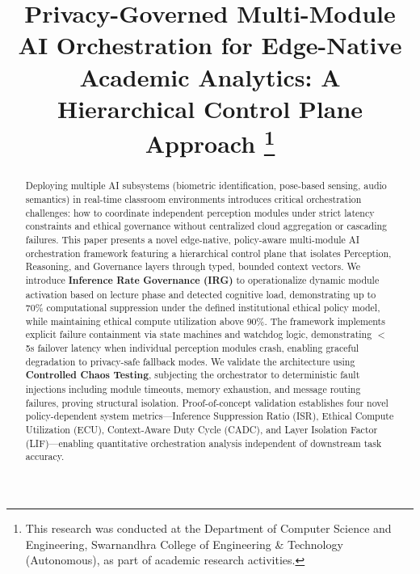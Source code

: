 \documentclass[conference]{IEEEtran}
\begin{document}
\title{Privacy-Governed Multi-Module AI Orchestration for Edge-Native Academic Analytics: A Hierarchical Control Plane Approach
\thanks{This research was conducted at the Department of Computer Science and Engineering, Swarnandhra College of Engineering \& Technology (Autonomous), as part of academic research activities.}
}

\author{
}

\maketitle

\begin{abstract}
Deploying multiple AI subsystems (biometric identification, pose-based sensing, audio semantics) in real-time classroom environments introduces critical orchestration challenges: how to coordinate independent perception modules under strict latency constraints and ethical governance without centralized cloud aggregation or cascading failures. This paper presents a novel edge-native, policy-aware multi-module AI orchestration framework featuring a hierarchical control plane that isolates Perception, Reasoning, and Governance layers through typed, bounded context vectors. We introduce \textbf{Inference Rate Governance (IRG)} to operationalize dynamic module activation based on lecture phase and detected cognitive load, demonstrating up to 70\% computational suppression under the defined institutional ethical policy model, while maintaining ethical compute utilization above 90\%. The framework implements explicit failure containment via state machines and watchdog logic, demonstrating $<$5s failover latency when individual perception modules crash, enabling graceful degradation to privacy-safe fallback modes. We validate the architecture using \textbf{Controlled Chaos Testing}, subjecting the orchestrator to deterministic fault injections including module timeouts, memory exhaustion, and message routing failures, proving structural isolation. Proof-of-concept validation establishes four novel policy-dependent system metrics---Inference Suppression Ratio (ISR), Ethical Compute Utilization (ECU), Context-Aware Duty Cycle (CADC), and Layer Isolation Factor (LIF)---enabling quantitative orchestration analysis independent of downstream task accuracy. 
\end{abstract}
\end{document}
